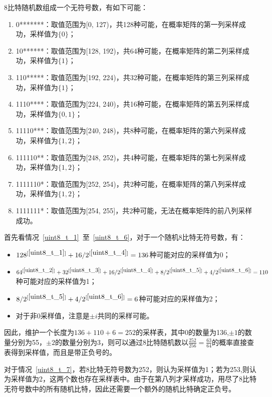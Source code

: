 \documentclass{article}
\begin{document}
	
	8比特随机数组成一个无符号数，有如下可能：
	\begin{enumerate}
		\item 0*******：取值范围为[0, 127)，共128种可能，在概率矩阵的第一列采样成功，采样值为$\{0\}$；\label{uint8_t_1}
		\item 10******：取值范围为[128, 192)，共64种可能，在概率矩阵的第二列采样成功，采样值为$\{1\}$；\label{uint8_t_2}
		\item 110*****：取值范围为[192, 224)，共32种可能，在概率矩阵的第三列采样成功，采样值为$\{1\}$；\label{uint8_t_3}
		\item 1110****：取值范围为[224, 240)，共16种可能，在概率矩阵的第五列采样成功，采样值为$\{0, 1\}$；\label{uint8_t_4}
		\item 11110***：取值范围为[240, 248)，共8种可能，在概率矩阵的第六列采样成功，采样值为$\{1, 2\}$；\label{uint8_t_5}
		\item 111110**：取值范围为[248, 252)，共4种可能，在概率矩阵的第七列采样成功，采样值为$\{1, 2\}$；\label{uint8_t_6}
		\item 1111110*：取值范围为[252, 254)，共2种可能，在概率矩阵的第八列采样成功，采样值为$\{1, 2\}$；\label{uint8_t_7}
		\item 1111111*：取值范围为[254, 255]，共2种可能，无法在概率矩阵的前八列采样成功。\label{uint8_t_8}
	\end{enumerate}
	首先看情况~\ref{uint8_t_1}~至~\ref{uint8_t_6}，对于一个随机8比特无符号数，有：
	\begin{itemize}
		\item $128^{[\ref{uint8_t_1}]} + 16/2^{[\ref{uint8_t_4}]} = 136$种可能对应的采样值为0；
		\item $64^{[\ref{uint8_t_2}]} + 32^{[\ref{uint8_t_3}]} + 16/2^{[\ref{uint8_t_4}]} + 8/2^{[\ref{uint8_t_5}]} + 4/2^{[\ref{uint8_t_6}]} = 110$种可能对应的采样值为1；
		\item $8/2^{[\ref{uint8_t_5}]} + 4/2^{[\ref{uint8_t_6}]} = 6$种可能对应的采样值为2；
		\item 对于非0采样值，注意是$\pm i$共同的采样可能。
	\end{itemize}
	因此，维护一个长度为$136 + 110 + 6 = 252$的采样表，其中0的数量为136,$\pm1$的数量分别为55，$\pm2$的数量分别为3，则可以通过8比特随机数以$\frac{252}{256} = \frac{63}{64}$的概率直接查表得到采样值，而且是带正负号的。
	
	对于情况~\ref{uint8_t_7}，若8比特无符号数为252，则认为采样值为1；若为253,则认为采样值为2，这两个数也存在采样表中。由于在第八列才采样成功，用尽了8比特无符号数中的所有随机比特，因此还需要一个额外的随机比特确定正负号。
	
\end{document}
